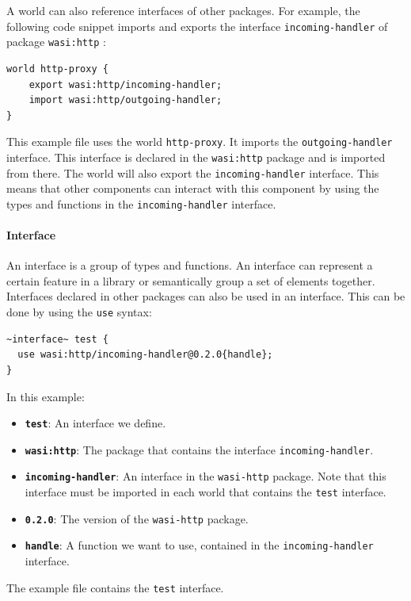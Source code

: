 A world can also reference interfaces of other packages. For example, the following code snippet imports and exports the interface \texttt{incoming-handler} of package \texttt{wasi:http} \cite{wit_examples}:
\begin{lstlisting}[language=wit]
world http-proxy {
    export wasi:http/incoming-handler;
    import wasi:http/outgoing-handler;
}
\end{lstlisting}

This example file uses the world \texttt{http-proxy}. It imports the \texttt{outgoing-handler} interface. This interface is declared in the \texttt{wasi:http} package and is imported from there. The world will also export the \texttt{incoming-handler} interface. This means that other components can interact with this component by using the types and functions in the \texttt{incoming-handler} interface.

\paragraph{Interface}
An interface is a group of types and functions. An interface can represent a certain feature in a library or semantically group a set of elements together. Interfaces declared in other packages can also be used in an interface. This can be done by using the \texttt{use} syntax:
\begin{lstlisting}[language=wit]
~interface~ test {
  use wasi:http/incoming-handler@0.2.0{handle};
}
\end{lstlisting}

In this example:
\begin{itemize}
\item \textbf{\texttt{test}}: An interface we define.
\item \textbf{\texttt{wasi:http}}: The package that contains the interface \texttt{incoming-handler}.
\item \textbf{\texttt{incoming-handler}}: An interface in the \texttt{wasi-http} package. Note that this interface must be imported in each world that contains the \texttt{test} interface.
\item \textbf{\texttt{0.2.0}}: The version of the \texttt{wasi-http} package.
\item \textbf{\texttt{handle}}: A function we want to use, contained in the \texttt{incoming-handler} interface.
\end{itemize}

The example file contains the \texttt{test} interface.

